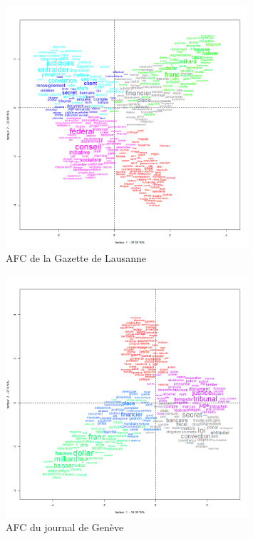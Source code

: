\begin{figure}
\centering
\includegraphics[width=0.8\textwidth,height=\textheight]{AFC2DL_GDL.png}
\caption{AFC de la Gazette de Lausanne}
\end{figure}

\begin{figure}
\centering
\includegraphics[width=0.8\textwidth,height=\textheight]{AFC2DL_JDG.png}
\caption{AFC du journal de Genève}
\end{figure}
